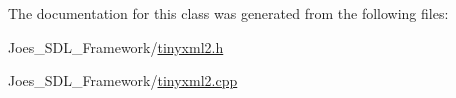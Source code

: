 The documentation for this class was generated from the following files\-:\begin{DoxyCompactItemize}
\item 
Joes\-\_\-\-S\-D\-L\-\_\-\-Framework/\hyperlink{tinyxml2_8h}{tinyxml2.\-h}\item 
Joes\-\_\-\-S\-D\-L\-\_\-\-Framework/\hyperlink{tinyxml2_8cpp}{tinyxml2.\-cpp}\end{DoxyCompactItemize}
